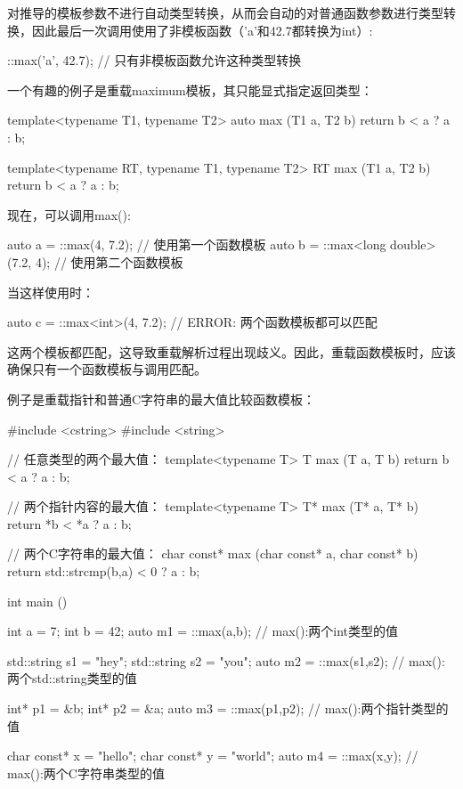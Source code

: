 对推导的模板参数不进行自动类型转换，从而会自动的对普通函数参数进行类型转换，因此最后一次调用使用了非模板函数（'a'和42.7都转换为int）:

\begin{cpp}
::max('a', 42.7); // 只有非模板函数允许这种类型转换
\end{cpp}

一个有趣的例子是重载maximum模板，其只能显式指定返回类型：

\begin{cpp}
template<typename T1, typename T2>
auto max (T1 a, T2 b)
{
	return b < a ? a : b;
}

template<typename RT, typename T1, typename T2>
RT max (T1 a, T2 b)
{
	return b < a ? a : b;
}
\end{cpp}

现在，可以调用max():

\begin{cpp}
auto a = ::max(4, 7.2); // 使用第一个函数模板
auto b = ::max<long double>(7.2, 4); // 使用第二个函数模板
\end{cpp}

当这样使用时：

\begin{cpp}
auto c = ::max<int>(4, 7.2); // ERROR: 两个函数模板都可以匹配
\end{cpp}

这两个模板都匹配，这导致重载解析过程出现歧义。因此，重载函数模板时，应该确保只有一个函数模板与调用匹配。

例子是重载指针和普通C字符串的最大值比较函数模板：

\begin{cpp}
#include <cstring>
#include <string>

// 任意类型的两个最大值：
template<typename T>
T max (T a, T b)
{
	return b < a ? a : b;
}

// 两个指针内容的最大值：
template<typename T>
T* max (T* a, T* b)
{
	return *b < *a ? a : b;
}

// 两个C字符串的最大值：
char const* max (char const* a, char const* b)
{
	return std::strcmp(b,a) < 0 ? a : b;
}

int main ()
{
	int a = 7;
	int b = 42;
	auto m1 = ::max(a,b); // max():两个int类型的值
	
	std::string s1 = "hey";
	std::string s2 = "you";
	auto m2 = ::max(s1,s2); // max():两个std::string类型的值
	
	int* p1 = &b;
	int* p2 = &a;
	auto m3 = ::max(p1,p2); // max():两个指针类型的值
	
	char const* x = "hello";
	char const* y = "world";
	auto m4 = ::max(x,y); // max():两个C字符串类型的值
}
\end{cpp}

